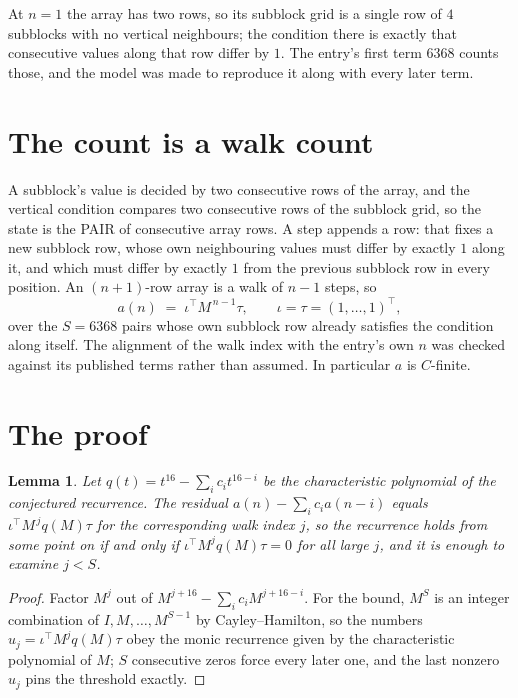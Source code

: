\documentclass[11pt,a4paper]{article}
\theoremstyle{plain}
\newtheorem{lemma}[theorem]{Lemma}
\theoremstyle{definition}
\begin{document}
At $n=1$ the array has two rows, so its subblock grid is a single row of $4$ subblocks with
no vertical neighbours; the condition there is exactly that consecutive values along that row
differ by $1$. The entry's first term $6368$ counts those, and the model was made to
reproduce it along with every later term.

\section{The count is a walk count}

A subblock's value is decided by two consecutive rows of the array, and the
vertical condition compares two consecutive rows of the subblock grid, so the state is the
PAIR of consecutive array rows. A step appends a row: that fixes a new subblock row, whose own
neighbouring values must differ by exactly $1$ along it, and which must differ by exactly
$1$ from the previous subblock row in every position. An $(n+1)$-row array is a walk of
$n-1$ steps, so
\[
a(n)\;=\;\iota^{\!\top}M^{\,n-1}\tau,\qquad\iota=\tau=(1,\dots,1)^{\!\top},
\]
over the $S=6368$ pairs whose own subblock row already satisfies the condition along itself.
The alignment of the walk index with the entry's own $n$ was checked against its published
terms rather than assumed. In particular $a$ is $C$-finite.

\section{The proof}

\begin{lemma}\label{lem:crit}
Let $q(t)=t^{16}-\sum_i c_it^{16-i}$ be the characteristic polynomial of the
conjectured recurrence. The residual $a(n)-\sum_ic_ia(n-i)$ equals
$\iota^{\!\top}M^{\,j}q(M)\tau$ for the corresponding walk index $j$, so the recurrence
holds from some point on if and only if $\iota^{\!\top}M^{j}q(M)\tau=0$ for all large $j$,
and it is enough to examine $j<S$.
\end{lemma}

\begin{proof}
Factor $M^{j}$ out of $M^{j+16}-\sum_ic_iM^{j+16-i}$. For the bound, $M^{S}$
is an integer combination of $I,M,\dots,M^{S-1}$ by Cayley--Hamilton, so the numbers
$u_j=\iota^{\!\top}M^{j}q(M)\tau$ obey the monic recurrence given by the characteristic
polynomial of $M$; $S$ consecutive zeros force every later one, and the last nonzero $u_j$
pins the threshold exactly.
\end{proof}
\end{document}

